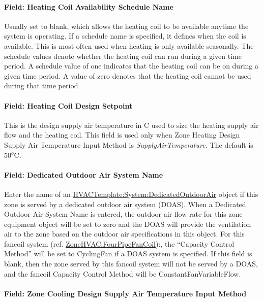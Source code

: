 \paragraph{Field: Heating Coil Availability Schedule Name}\label{field-heating-coil-availability-schedule-name}

Usually set to blank, which allows the heating coil to be available anytime the system is operating. If a schedule name is specified, it defines when the coil is available. This is most often used when heating is only available seasonally. The schedule values denote whether the heating coil can run during a given time period. A schedule value of one indicates that the heating coil can be on during a given time period. A value of zero denotes that the heating coil cannot be used during that time period

\paragraph{Field: Heating Coil Design Setpoint}\label{field-heating-coil-design-setpoint}

This is the design supply air temperature in C used to size the heating supply air flow and the heating coil. This field is used only when Zone Heating Design Supply Air Temperature Input Method is \emph{SupplyAirTemperature.} The default is 50\(^{o}\)C.

\paragraph{Field: Dedicated Outdoor Air System Name}\label{field-dedicated-outdoor-air-system-name-1}

Enter the name of an \hyperref[hvactemplatesystemdedicatedoutdoorair]{HVACTemplate:System:DedicatedOutdoorAir} object if this zone is served by a dedicated outdoor air system (DOAS). When a Dedicated Outdoor Air System Name is entered, the outdoor air flow rate for this zone equipment object will be set to zero and the DOAS will provide the ventilation air to the zone based on the outdoor air specifications in this object. For this fancoil system (ref. \hyperref[zonehvacfourpipefancoil]{ZoneHVAC:FourPipeFanCoil}):, the ``Capacity Control Method'' will be set to CyclingFan if a DOAS system is specified. If this field is blank, then the zone served by this fancoil system will not be served by a DOAS, and the fancoil Capacity Control Method will be ConstantFanVariableFlow.

\paragraph{Field: Zone Cooling Design Supply Air Temperature Input Method}\label{field-zone-cooling-design-supply-air-temperature-input-method-000}

